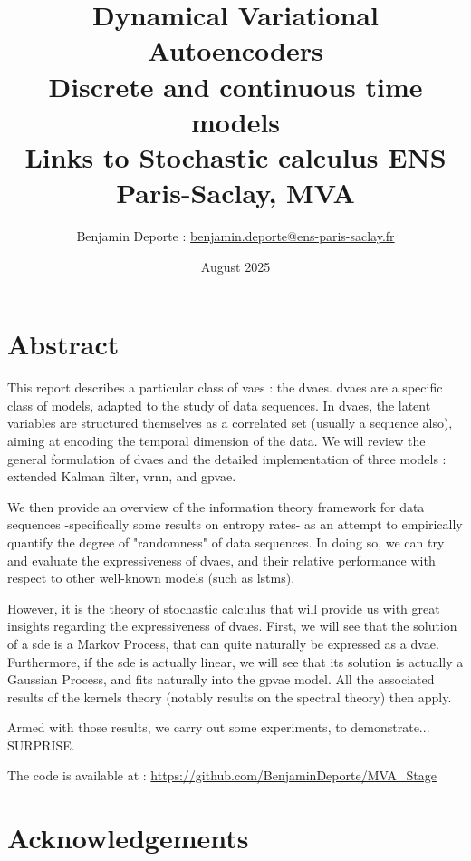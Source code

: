 \documentclass[twoside,11pt]{report}
\title{Dynamical Variational Autoencoders\\ Discrete and continuous time models\\ Links to Stochastic calculus
\vspace{1cm}
{\Large{ENS Paris-Saclay, MVA}}}
\author{
Benjamin Deporte : \href{mailto:benjamin.deporte@ens-paris-saclay.fr}{benjamin.deporte@ens-paris-saclay.fr}%
}
\date{August 2025}
\begin{document}
\everymath{\displaystyle}
\maketitle

\chapter*{Abstract}
This report describes a particular class of \glspl{vae} : the \glspl{dvae}. \glspl{dvae} are a specific class of models, adapted to the study of data sequences.
In \glspl{dvae}, the latent variables are structured themselves as a correlated set (usually a sequence also), aiming at encoding the temporal dimension of the data. 
We will review the general formulation of \glspl{dvae} and the detailed implementation of three models : extended Kalman filter, \gls{vrnn}, and \gls{gpvae}.

We then provide an overview of the information theory framework for data sequences -specifically some results on entropy rates- as an attempt to empirically  quantify the degree of "randomness" of data sequences.
In doing so, we can try and evaluate the expressiveness of \glspl{dvae}, and their relative performance with respect to other well-known models (such as \glspl{lstm}).

However, it is the theory of stochastic calculus that will provide us with great insights regarding the expressiveness of \glspl{dvae}.
First, we will see that the solution of a \gls{sde} is a Markov Process, that can quite naturally be expressed as a \gls{dvae}.
Furthermore, if the \gls{sde} is actually linear, we will see that its solution is actually a Gaussian Process, and fits naturally into the \gls{gpvae} model. 
All the associated results of the kernels theory (notably results on the spectral theory) then apply.

Armed with those results, we carry out some experiments, to demonstrate... SURPRISE.

The code is available at : \url{https://github.com/BenjaminDeporte/MVA_Stage}

\chapter*{Acknowledgements}



\newpage
\singlespacing
\tableofcontents

\newpage
\listoffigures
\end{document}
